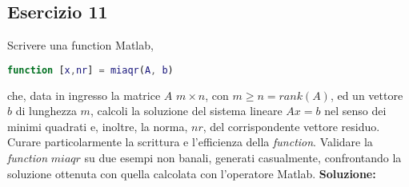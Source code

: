 \subsection{Esercizio 11}
Scrivere una function Matlab,
\begin{lstlisting}[language=Matlab]
    function [x,nr] = miaqr(A, b)
\end{lstlisting}
che, data in ingresso la matrice $A$ $m \times n$, con $m \geq n = rank(A)$, ed un vettore $b$ di lunghezza
$m$, calcoli la soluzione del sistema lineare $Ax = b$ nel senso dei minimi quadrati e, inoltre, la
norma, $nr$, del corrispondente vettore residuo. Curare particolarmente la scrittura e l'efficienza della
\textit{function}. Validare la \textit{function} $miaqr$ su due esempi non banali, generati casualmente, confrontando
la soluzione ottenuta con quella calcolata con l'operatore Matlab.
\newline \textbf{Soluzione:}
